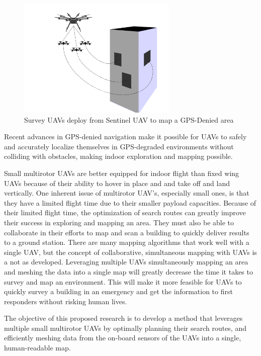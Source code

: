 \documentclass[12pt, letterpaper]{article}
\begin{document}
\begin{figure}[h] %
	\centering
	\includegraphics[trim = 0mm 0mm 0mm 0mm,clip,width=3in]{survey_drone_illustration.png}
	\caption{Survey UAVs deploy from Sentinel UAV to map a GPS-Denied area}
	\label{fig:sentinel_survey}
\end{figure}

Recent advances in GPS-denied navigation \cite{Wheeler2017} make it possible for UAVs to safely and accurately localize themselves in GPS-degraded environments without colliding with obstacles, making indoor exploration and mapping possible. 

Small multirotor UAVs are better equipped for indoor flight than fixed wing UAVs because of their ability to hover in place and and take off and land vertically. One inherent issue of multirotor UAV's, especially small ones, is that they have a limited flight time due to their smaller payload capacities. Because of their limited flight time, the optimization of search routes can greatly improve their success in exploring and mapping an area. They must also be able to collaborate in their efforts to map and scan a building to quickly deliver results to a ground station. There are many mapping algorithms that work well with a single UAV, but the concept of collaborative, simultaneous mapping with UAVs is a not as developed. Leveraging multiple UAVs simultaneously mapping an area and meshing the data into a single map will greatly decrease the time it takes to survey and map an environment. This will make it more feasible for UAVs to quickly survey a building in an emergency and get the information to first responders without risking human lives.

The objective of this proposed research is to develop a method that leverages multiple small multirotor UAVs by optimally planning their search routes, and efficiently meshing data from the on-board sensors of the UAVs into a single, human-readable map. 
\end{document}
